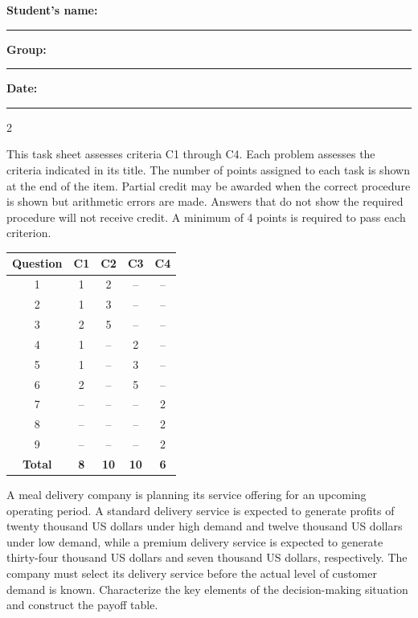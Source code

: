 	\vspace{0.1cm}
	\noindent
	\textbf{Student's name:} \rule{7cm}{0.4pt}\hfill
	\textbf{Group:} \rule{2cm}{0.4pt}\hfill
	\textbf{Date:} \rule{3cm}{0.4pt}
	
	\vspace{-3mm}
	\raggedcolumns
	\begin{multicols}{2}
		
		\vspace{-0.25cm}
		This task sheet assesses criteria C1 through C4. Each problem assesses the criteria indicated in its title. The number of points assigned to each task is shown at the end of the item. Partial credit may be awarded when the correct procedure is shown but arithmetic errors are made. Answers that do not show the required procedure will not receive credit. A minimum of 4 points is required to pass each criterion.
		
		\begin{center}
			\begin{tabular}{|c|c|c|c|c|}
				\hline
				\textbf{Question} & \textbf{C1} & \textbf{C2} & \textbf{C3} & \textbf{C4} \\ \hline
				1 & 1 & 2 & -- & -- \\ \hline
				2 & 1 & 3 & -- & -- \\ \hline
				3 & 2 & 5 & -- & -- \\ \hline
				4 & 1 & -- & 2 & -- \\ \hline
				5 & 1 & -- & 3 & -- \\ \hline
				6 & 2 & -- & 5 & -- \\ \hline
				7 & -- & -- & -- & 2 \\ \hline
				8 & -- & -- & -- & 2 \\ \hline
				9 & -- & -- & -- & 2 \\ \hline
				\textbf{Total} & \textbf{8} & \textbf{10} & \textbf{10} & \textbf{6} \\ \hline
			\end{tabular}
		\end{center}
		
		\columnbreak
		
		A meal delivery company is planning its service offering for an upcoming operating period. A standard delivery service is expected to generate profits of twenty thousand US dollars under high demand and twelve thousand US dollars under low demand, while a premium delivery service is expected to generate thirty-four thousand US dollars and seven thousand US dollars, respectively. The company must select its delivery service before the actual level of customer demand is known. Characterize the key elements of the decision-making situation and construct the payoff table.
		

\end{multicols}
